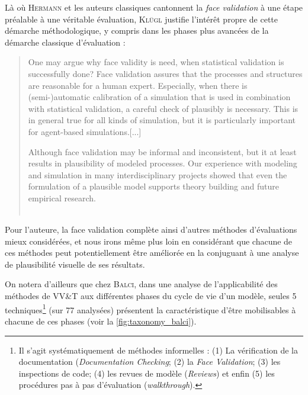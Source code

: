 Là où H\textsc{ermann} et les auteurs classiques cantonnent la \textit{face validation} à une étape préalable à une véritable évaluation, K\textsc{lügl} justifie l'intérêt propre de cette démarche méthodologique, y compris dans les phases plus avancées de la démarche classique d'évaluation :

\begin{quotation}
	\noindent \og One may argue why face validity is need, when statistical validation is successfully done?
	Face validation assures that the processes and structures are reasonable for a human expert.
	Especially, when there is (semi-)automatic calibration of a simulation that is used in combination with statistical validation, a careful check of plausibly is necessary.
	This is in general true for all kinds of simulation, but it is particularly important for agent-based simulations.[...]
	
	\noindent Although face validation may be informal and inconsistent, but it at least results in plausibility of modeled processes.
	Our experience with modeling and simulation in many interdisciplinary projects showed that even the formulation of a plausible model supports theory building and future empirical research.\fg{}\\
	\mbox{}~ \hfill \textcite[40;43]{klugl_validation_2008}
\end{quotation}


Pour l'auteure, la face validation complète ainsi d'autres méthodes d'évaluations mieux considérées, et nous irons même plus loin en considérant que chacune de ces méthodes peut potentiellement être améliorée en la conjuguant à une analyse de plausibilité visuelle de ses résultats.

On notera d'ailleurs que chez B\textsc{alci}, dans une analyse de l'applicabilité des méthodes de \og VV\&T\fg{} aux différentes phases du cycle de vie d'un modèle, seules 5 techniques\footnote{
	Il s'agit systématiquement de méthodes \og informelles\fg{} : 
	(1) La vérification de la documentation (\textit{Documentation Checking}; (2) la \textit{Face Validation}; (3) les inspections de code; (4) les \og revues\fg{} de modèle (\textit{Reviews}) et enfin (5) les \og procédures pas à pas\fg{} d'évaluation (\textit{walkthrough}).
} (sur 77 analysées) présentent la caractéristique d'être mobilisables à chacune de ces phases (voir la \autoref{fig:taxonomy_balci}).


